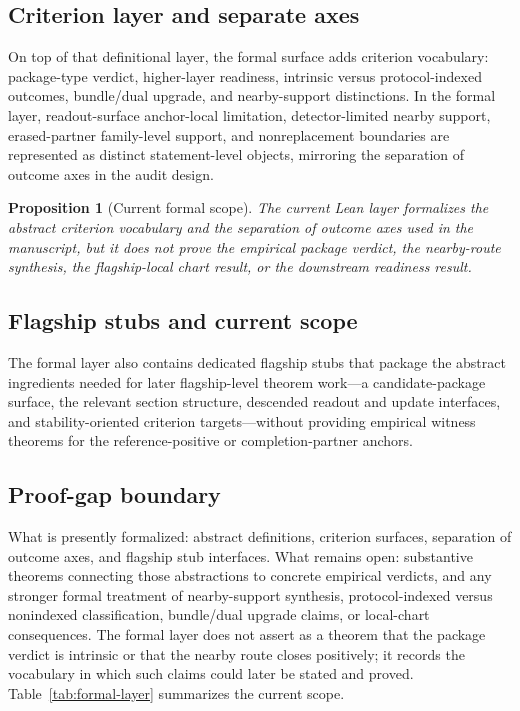 \documentclass[11pt]{article}
\newtheorem{proposition}[theorem]{Proposition}
\theoremstyle{definition}
\begin{document}
\subsection{Criterion layer and separate axes}

On top of that definitional layer, the formal surface adds criterion vocabulary: package-type verdict, higher-layer readiness, intrinsic versus protocol-indexed outcomes, bundle/dual upgrade, and nearby-support distinctions. In the formal layer, readout-surface anchor-local limitation, detector-limited nearby support, erased-partner family-level support, and nonreplacement boundaries are represented as distinct statement-level objects, mirroring the separation of outcome axes in the audit design.

\begin{proposition}[Current formal scope]
\label{prop:formal-scope}
The current Lean layer formalizes the abstract criterion vocabulary and the separation of outcome axes used in the manuscript, but it does not prove the empirical package verdict, the nearby-route synthesis, the flagship-local chart result, or the downstream readiness result.
\end{proposition}

\subsection{Flagship stubs and current scope}

The formal layer also contains dedicated flagship stubs that package the abstract ingredients needed for later flagship-level theorem work---a candidate-package surface, the relevant section structure, descended readout and update interfaces, and stability-oriented criterion targets---without providing empirical witness theorems for the reference-positive or completion-partner anchors.

\subsection{Proof-gap boundary}

What is presently formalized: abstract definitions, criterion surfaces, separation of outcome axes, and flagship stub interfaces. What remains open: substantive theorems connecting those abstractions to concrete empirical verdicts, and any stronger formal treatment of nearby-support synthesis, protocol-indexed versus nonindexed classification, bundle/dual upgrade claims, or local-chart consequences. The formal layer does not assert as a theorem that the package verdict is intrinsic or that the nearby route closes positively; it records the vocabulary in which such claims could later be stated and proved. Table~\ref{tab:formal-layer} summarizes the current scope.
\end{document}
